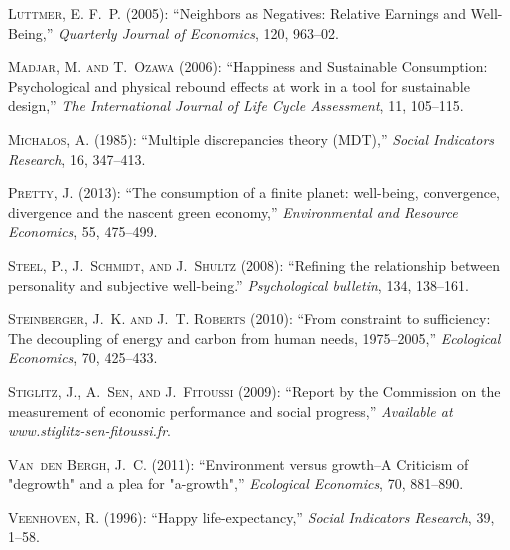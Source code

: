 \documentclass[10pt, letterpaper]{article}
\begin{document}
\begin{spacing}{1.4}
\begin{thebibliography}{36}
\textsc{Luttmer, E. F.~P.} (2005): \enquote{Neighbors as Negatives: Relative
  Earnings and Well-Being,} \emph{Quarterly Journal of Economics}, 120,
  963--02.

\textsc{Madjar, M. and T.~Ozawa} (2006): \enquote{Happiness and Sustainable
  Consumption: Psychological and physical rebound effects at work in a tool for
  sustainable design,} \emph{The International Journal of Life Cycle
  Assessment}, 11, 105--115.

\textsc{Michalos, A.} (1985): \enquote{Multiple discrepancies theory (MDT),}
  \emph{Social Indicators Research}, 16, 347--413.

\textsc{Pretty, J.} (2013): \enquote{The consumption of a finite planet:
  well-being, convergence, divergence and the nascent green economy,}
  \emph{Environmental and Resource Economics}, 55, 475--499.

\textsc{Steel, P., J.~Schmidt, and J.~Shultz} (2008): \enquote{Refining the
  relationship between personality and subjective well-being.}
  \emph{Psychological bulletin}, 134, 138--161.

\textsc{Steinberger, J.~K. and J.~T. Roberts} (2010): \enquote{From constraint
  to sufficiency: The decoupling of energy and carbon from human needs,
  1975--2005,} \emph{Ecological Economics}, 70, 425--433.

\textsc{Stiglitz, J., A.~Sen, and J.~Fitoussi} (2009): \enquote{Report by the
  Commission on the measurement of economic performance and social progress,}
  \emph{Available at www.stiglitz-sen-fitoussi.fr}.

\textsc{Van~den Bergh, J.~C.} (2011): \enquote{Environment versus growth--A
  Criticism of "degrowth" and a plea for "a-growth",} \emph{Ecological
  Economics}, 70, 881--890.

\textsc{Veenhoven, R.} (1996): \enquote{Happy life-expectancy,} \emph{Social
  Indicators Research}, 39, 1--58.


\end{thebibliography}
\end{spacing}
\end{document}
